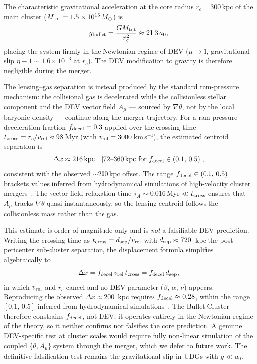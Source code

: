 \documentclass[aps,prd,twocolumn,showpacs,superscriptaddress]{revtex4-2}
\newcommand{\aO}{a_0}
\begin{document}
The characteristic gravitational acceleration at the core
radius $r_c = 300$\,kpc of the main cluster
($M_{\rm tot} = 1.5\times10^{15}\,M_\odot$) is
\begin{equation}
  g_{\rm bullet} = \frac{GM_{\rm tot}}{r_c^2}
  \approx 21.3\,\aO,
\end{equation}
placing the system firmly in the Newtonian regime of DEV
($\mu \to 1$, gravitational slip $\eta - 1 \sim 1.6\times10^{-3}$
at $r_c$). The DEV modification to gravity is therefore
negligible during the merger.

The lensing--gas separation is instead produced by the
standard ram-pressure mechanism: the collisional gas is
decelerated while the collisionless stellar component and
the DEV vector field $A_\mu$ --- sourced by $\nabla\theta$,
not by the local baryonic density --- continue along the
merger trajectory. For a ram-pressure deceleration fraction
$f_{\rm decel} = 0.3$ applied over the crossing time
$t_{\rm cross} = r_c/v_{\rm rel} \approx 98$\,Myr
(with $v_{\rm rel} = 3000$\,km\,s$^{-1}$), the estimated
centroid separation is
\begin{equation}
  \Delta x \approx 216\,\mathrm{kpc}
  \quad [72\text{--}360\,\mathrm{kpc\ for\ }
  f_{\rm decel}\in(0.1,\,0.5)],
\end{equation}
consistent with the observed ${\sim}200$\,kpc offset.
The range $f_{\rm decel}\in(0.1,\,0.5)$ brackets values
inferred from hydrodynamical simulations of high-velocity
cluster mergers~\cite{SpringelFarrar2007}.
The vector field relaxation time $\tau_A \sim 0.016$\,Myr
$\ll t_{\rm cross}$ ensures that $A_\mu$ tracks
$\nabla\theta$ quasi-instantaneously, so the lensing
centroid follows the collisionless mass rather than the gas.

This estimate is order-of-magnitude only and is \emph{not} a
falsifiable DEV prediction. Writing the crossing time as
$t_{\rm cross} = d_{\rm sep}/v_{\rm rel}$ with
$d_{\rm sep}\approx 720$~kpc the post-pericenter sub-cluster
separation, the displacement formula simplifies algebraically to
\begin{equation}
  \Delta x = f_{\rm decel}\,v_{\rm rel}\,t_{\rm cross}
           = f_{\rm decel}\,d_{\rm sep},
  \label{eq:bullet_simplified}
\end{equation}
in which $v_{\rm rel}$ and $r_c$ cancel and no DEV parameter
($\beta$, $\alpha$, $\nu$) appears. Reproducing the observed
$\Delta x\approx 200$~kpc requires $f_{\rm decel}\approx 0.28$,
within the range $[0.1,\,0.5]$ inferred from hydrodynamical
simulations~\cite{SpringelFarrar2007}. The Bullet Cluster
therefore constrains $f_{\rm decel}$, not DEV; it operates
entirely in the Newtonian regime of the theory, so it neither
confirms nor falsifies the core prediction. A genuine
DEV-specific test at cluster scales would require fully
non-linear simulation of the coupled $\{\theta, A_\mu\}$
system through the merger, which we defer to future work. The
definitive falsification test remains the gravitational slip
in UDGs with $g \ll \aO$.
\end{document}
